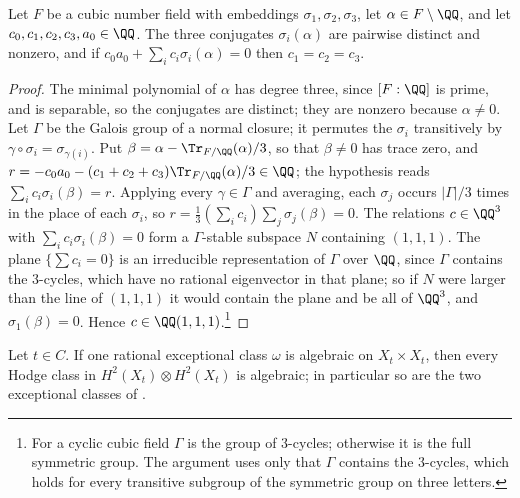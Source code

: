 \begin{lemma}\label{lem:conjugates}
Let $F$ be a cubic number field with embeddings $\sigma_{1},\sigma_{2},
\sigma_{3}$, let $\alpha\in F\setminus\QQ$, and let
$c_{0},c_{1},c_{2},c_{3},a_{0}\in\QQ$. The three conjugates
$\sigma_{i}(\alpha)$ are pairwise distinct and nonzero, and if
$c_{0}a_{0}+\sum_{i}c_{i}\sigma_{i}(\alpha)=0$ then $c_{1}=c_{2}=c_{3}$.
\end{lemma}

\begin{proof}
The minimal polynomial of $\alpha$ has degree three, since $[F:\QQ]$ is prime,
and is separable, so the conjugates are distinct; they are nonzero because
$\alpha\ne0$. Let $\Gamma$ be the Galois group of a normal closure; it
permutes the $\sigma_{i}$ transitively by $\gamma\circ\sigma_{i}=
\sigma_{\gamma(i)}$. Put $\beta=\alpha-\Tr_{F/\QQ}(\alpha)/3$, so that
$\beta\ne0$ has trace zero, and $r=-c_{0}a_{0}-(c_{1}+c_{2}+c_{3})
\Tr_{F/\QQ}(\alpha)/3\in\QQ$; the hypothesis reads $\sum_{i}c_{i}\sigma_{i}
(\beta)=r$. Applying every $\gamma\in\Gamma$ and averaging, each $\sigma_{j}$
occurs $|\Gamma|/3$ times in the place of each $\sigma_{i}$, so
$r=\frac13(\sum_{i}c_{i})\sum_{j}\sigma_{j}(\beta)=0$. The relations
$c\in\QQ^{3}$ with $\sum_{i}c_{i}\sigma_{i}(\beta)=0$ form a $\Gamma$-stable
subspace $N$ containing $(1,1,1)$. The plane $\{\sum c_{i}=0\}$ is an
irreducible representation of $\Gamma$ over $\QQ$, since $\Gamma$ contains
the $3$-cycles, which have no rational eigenvector in that plane; so if $N$
were larger than the line of $(1,1,1)$ it would contain the plane and be all
of $\QQ^{3}$, and $\sigma_{1}(\beta)=0$. Hence $c\in\QQ(1,1,1)$.\footnote{For a
cyclic cubic field $\Gamma$ is the group of $3$-cycles; otherwise it is the
full symmetric group. The argument uses only that $\Gamma$ contains the
$3$-cycles, which holds for every transitive subgroup of the symmetric group
on three letters.}
\end{proof}

\begin{lemma}\label{lem:oneexceptional}
Let $t\in C$. If one rational exceptional class $\omega$ is algebraic on
$X_{t}\times X_{t}$, then every Hodge class in $H^{2}(X_{t})\otimes
H^{2}(X_{t})$ is algebraic; in particular so are the two exceptional classes
of .
\end{lemma}


